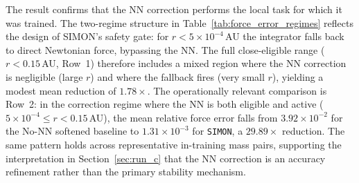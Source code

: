 \documentclass[12pt]{article}
\begin{document}
\begin{table}[H]
\centering
\caption{Mass robustness in the operational correction regime.}
\label{tab:force_mass_robustness}
\scriptsize
\setlength{\tabcolsep}{4pt}
\renewcommand{\arraystretch}{1.12}
\end{table}

The result confirms that the NN correction performs the local task for which it was
trained. The two-regime structure in Table~\ref{tab:force_error_regimes} reflects the
design of \textsc{SIMON}'s safety gate: for $r < 5\times10^{-4}$\,AU the integrator
falls back to direct Newtonian force, bypassing the NN. The full close-eligible
range ($r < 0.15$\,AU, Row~1) therefore includes a mixed region where the NN
correction is negligible (large $r$) and where the fallback fires (very small $r$),
yielding a modest mean reduction of $1.78\times$. The operationally relevant
comparison is Row~2: in the correction regime where the NN is both eligible and
active ($5\times10^{-4}\leq r < 0.15$\,AU), the mean relative force error falls from
\(3.92\times10^{-2}\) for the No-NN softened baseline to \(1.31\times10^{-3}\) for
\texttt{SIMON}, a \(29.89\times\) reduction. The same pattern holds across
representative in-training mass pairs, supporting the interpretation in
Section~\ref{sec:run_c} that the NN correction is an accuracy refinement rather than
the primary stability mechanism.


{}
\end{document}
